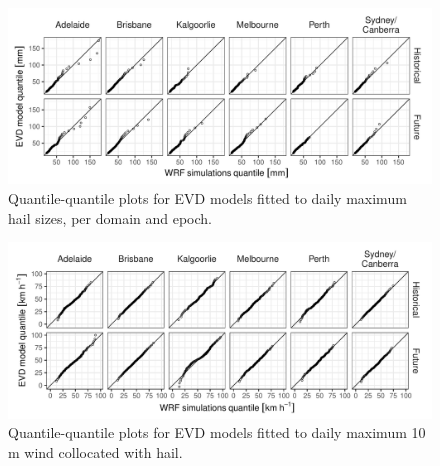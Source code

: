 \documentclass[draft,grl]{agutexSI2019}\usepackage[]{graphicx}\usepackage[]{xcolor}
\begin{document}
\begin{article}
\begin{figure}[!ht]
    \includegraphics[width=\textwidth]{figures/qq_hail}
    \caption{Quantile-quantile plots for EVD models fitted to daily maximum hail sizes, per domain and epoch.}
    \label{fig:qq_hail}
\end{figure}

\begin{figure}[!ht]
    \includegraphics[width=\textwidth]{figures/qq_wind}
    \caption{Quantile-quantile plots for EVD models fitted to daily maximum 10 m wind collocated with hail.}
    \label{fig:qq_wind}
\end{figure}


\end{article}
\end{document}
